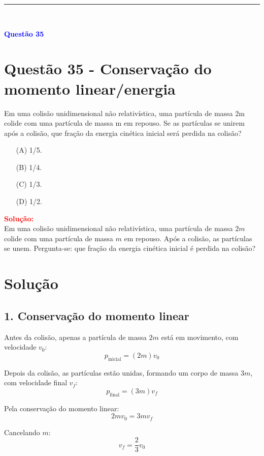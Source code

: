 \documentclass[a4paper,12pt]{article}
\begin{document}
\noindent\rule{\linewidth}{0.6pt}\\

\begin{flushleft}
\textbf{\textcolor{blue}{\Large Quest\~ao 35}}\\
\noindent
\section{Quest\~ao 35 - Conservação do momento linear/energia}
Em uma colisão unidimensional não relativística, uma
partícula de massa 2m colide com uma partícula de massa m
em repouso. Se as partículas se unirem após a colisão, que
fração da energia cinética inicial será perdida na colisão?

\begin{itemize}
\item[(A)] 1/5.
\item[(B)] 1/4.
\item[(C)] 1/3.
\item[(D)] 1/2.
\end{itemize}

\vspace{0.5cm}

\textcolor{red}{\textbf{Solução:}}\\

Em uma colisão unidimensional não relativística, uma partícula de massa \(2m\) colide com uma partícula de massa \(m\) em repouso.  
Após a colisão, as partículas se unem. Pergunta-se: que fração da energia cinética inicial é perdida na colisão?

\section*{Solução}

\subsection*{1. Conservação do momento linear}

Antes da colisão, apenas a partícula de massa \(2m\) está em movimento, com velocidade \(v_0\):
\[
p_\text{inicial} = (2m) v_0
\]

Depois da colisão, as partículas estão unidas, formando um corpo de massa \(3m\), com velocidade final \(v_f\):
\[
p_\text{final} = (3m) v_f
\]

Pela conservação do momento linear:
\[
\boxed{
2m v_0 = 3m v_f}
\]

Cancelando \(m\):
\[
v_f = \frac{2}{3} v_0
\]


\end{flushleft}
\end{document}
